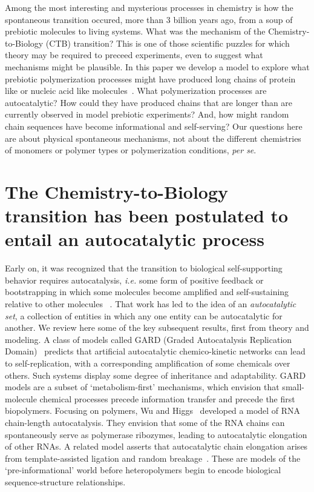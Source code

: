 \documentclass[twocolumn,letterpaper]{revtex4-1}
\begin{document}
 Among the most interesting and mysterious processes in chemistry is how the spontaneous 
transition 
occured, more than 3 billion years ago, from a soup of prebiotic molecules to living systems.  
What 
was the mechanism of the Chemistry-to-Biology (CTB) transition?  This is one of those scientific 
puzzles for which theory may be required to preceed experiments, even to suggest what mechanisms 
might be plausible.  In this paper we develop a model to 
explore what prebiotic polymerization processes might have produced long chains of protein like or 
nucleic acid like molecules~\cite{Joyce1987,Abel2005}.  What polymerization processes are 
autocatalytic?  How could they have produced chains that are longer than are currently observed in 
model prebiotic experiments?  And, how might random chain sequences have become informational and 
self-serving?  Our questions here are about physical spontaneous mechanisms, not about the 
different chemistries of monomers or polymer types or polymerization conditions, \emph{per se}.  
 
 \section*{The Chemistry-to-Biology transition has been postulated to entail an autocatalytic 
process}
  Early on, it was 
recognized 
that the transition to biological self-supporting behavior requires autocatalysis, \emph{i.e.} some 
form of positive feedback or 
bootstrapping in which some molecules become amplified and self-sustaining relative to other 
molecules 
~\cite{eigen1971selforganization,Eigen1977,Eigen1978,Dyson1985,Prigogine1989,Kauffman1986}.  That 
work has led to the idea of an \emph{autocatalytic set}, a collection of entities in which any one 
entity can be autocatalytic for another.  We review here some of the key subsequent results, first 
from theory and modeling.  A class of models called GARD (Graded Autocatalysis Replication 
Domain)~\cite{segre1998graded,Segre2000,Markovitch2012} predicts that artificial autocatalytic 
chemico-kinetic networks can lead to self-replication, with a corresponding amplification of some 
chemicals over others. Such systems  display some degree of 
inheritance and adaptability.  GARD models are a subset of `metabolism-first' 
mechanisms, which envision that 
small-molecule chemical processes precede information transfer and precede the first biopolymers.  
Focusing on polymers, Wu and Higgs~\cite{Wu2009} developed a model of RNA chain-length 
autocatalysis.  They envision that some of the RNA chains can spontaneously serve as polymerase 
ribozymes, leading to autocatalytic elongation of other RNAs.  A related model asserts that 
autocatalytic chain elongation arises from template-assisted ligation and random 
breakage~\cite{Tkachenko2014}.  These are models of the `pre-informational' world before 
heteropolymers begin to encode biological sequence-structure relationships.  
 
\end{document}
